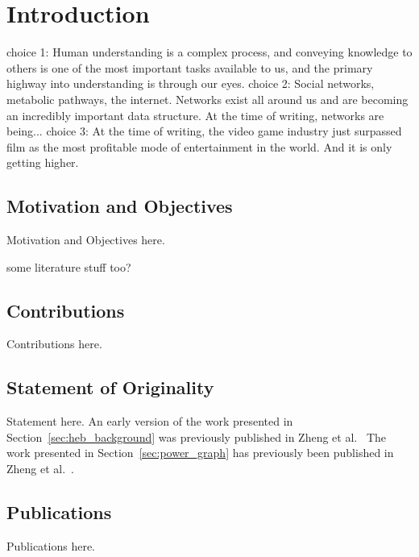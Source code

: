 \chapter{Introduction}
choice 1: Human understanding is a complex process, and conveying knowledge to others is one of the most important tasks available to us, and the primary highway into understanding is through our eyes.
choice 2: Social networks, metabolic pathways, the internet. Networks exist all around us and are becoming an incredibly important data structure. At the time of writing, networks are being...
choice 3: At the time of writing, the video game industry just surpassed film as the most profitable mode of entertainment in the world. And it is only getting higher.

\section{Motivation and Objectives}

Motivation and Objectives here.

some literature stuff too?

\section{Contributions}

Contributions here.


\section{Statement of Originality}

Statement here.
An early version of the work presented in Section~\ref{sec:heb_background} was previously published in Zheng et al.\ \cite{Zheng2018a}
The work presented in Section~\ref{sec:power_graph} has previously been published in Zheng et al.\ \cite{Zheng2019}.


\section{Publications}

Publications here.